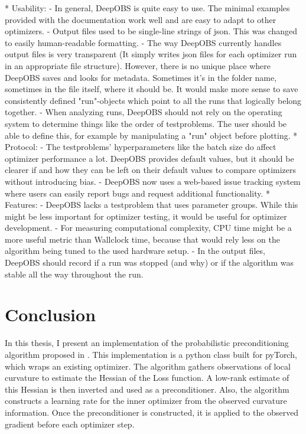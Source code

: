 \documentclass[twoside,12pt,a4paper]{report}
\begin{document}
\begin{markdown}
* Usability:
	- In general, DeepOBS is quite easy to use. The minimal examples provided with the documentation work well and are easy to adapt to other optimizers.
	- Output files used to be single-line strings of json. This was changed to easily human-readable formatting.
	- The way DeepOBS currently handles output files is very transparent (It simply writes json files for each optimizer run in an appropriate file structure). However, there is no unique place where DeepOBS saves and looks for metadata. Sometimes it's in the folder name, sometimes in the file itself, where it should be. It would make more sense to save consistently defined "run"-objects which point to all the runs that logically belong together.
	- When analyzing runs, DeepOBS should not rely on the operating system to determine things like the order of testproblems. The user should be able to define this, for example by manipulating a "run" object before plotting.
* Protocol: 
	- The testproblems' hyperparameters like the batch size do affect optimizer performance a lot. DeepOBS provides default values, but it should be clearer if and how they can be left on their default values to compare optimizers without introducing bias.
	- DeepOBS now uses a web-based issue tracking system where users can easily report bugs and request additional functionality.
* Features:
	- DeepOBS lacks a testproblem that uses parameter groups. While this might be less important for optimizer testing, it would be useful for optimizer development.
	- For measuring computational complexity, CPU time might be a more useful metric than Wallclock time, because that would rely less on the algorithm being tuned to the used hardware setup.
	- In the output files, DeepOBS should record if a run was stopped (and why) or if the algorithm was stable all the way throughout the run.
\end{markdown}

\chapter{Conclusion}
In this thesis, I present an implementation of the probabilistic preconditioning algorithm proposed in \cite{roos2019active}. This implementation is a python class built for pyTorch, which wraps an existing optimizer. The algorithm gathers observations of local curvature to estimate the Hessian of the Loss function. A low-rank estimate of this Hessian is then inverted and used as a preconditioner. Also, the algorithm constructs a learning rate for the inner optimizer from the observed curvature information. Once the preconditioner is constructed, it is applied to the observed gradient before each optimizer step.
\end{document}
